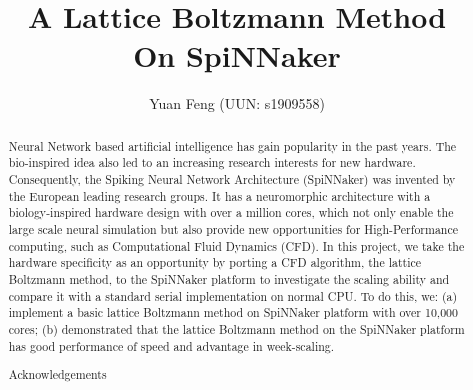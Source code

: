\documentclass[12pt, twoside]{article}
\title{A Lattice Boltzmann Method \\ On SpiNNaker }
\author{Yuan Feng (UUN: s1909558)}
\begin{document}


\newpage
\begin{abstract}


Neural Network based artificial intelligence has gain popularity in the past years. The bio-inspired idea also led to an increasing research interests for new hardware. Consequently, the Spiking Neural Network Architecture (SpiNNaker) was invented by the European leading research groups. It has a neuromorphic architecture with a biology-inspired hardware design with over a million cores, which not only enable the large scale neural simulation but also provide new opportunities for High-Performance computing, such as Computational Fluid Dynamics (CFD). In this project, we take the hardware specificity as an opportunity by porting a CFD algorithm, the lattice Boltzmann method, to the SpiNNaker platform to investigate the scaling ability and compare it with a standard serial implementation on normal CPU. To do this, we: (a) implement a basic lattice Boltzmann method on SpiNNaker platform with over 10,000 cores; (b) demonstrated that the lattice Boltzmann method on the SpiNNaker platform has good performance of speed and advantage in week-scaling.

\end{abstract}



\newpage
\renewcommand{\abstractname}{Acknowledgements}
\begin{abstract}

Acknowledgements

\end{abstract}

\newpage
\tableofcontents

\newpage

\newpage

\newpage

\newpage

\newpage

\newpage


\newpage
%
%


\end{document}
